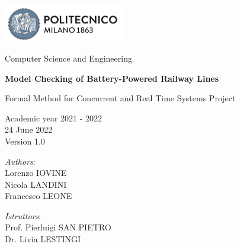 
\usepackage{listings}





{\begin{titlepage}
     \begin{center}
         \includegraphics[width=0.4\textwidth]{images/PolimiLogo.png}

         \vspace{0.2cm}

         \Large Computer Science and Engineering

         \vspace{0.9cm}

         \Huge \textbf{Model Checking of Battery-Powered Railway Lines}

         \vspace{0.7cm}
         \huge Formal Method for Concurrent and Real Time Systems Project

         \vspace{1.5cm}
         \Large Academic year 2021 - 2022\\
         \vspace{1cm}
         24 June 2022\\Version 1.0
         \vspace{3cm}

         \large
         \begin{minipage}{.1\textwidth}
             \null
         \end{minipage}%
         \begin{minipage}{.4\textwidth}
             \textit{Authors}:\\
             Lorenzo IOVINE\\
             Nicola LANDINI\\
             Francesco LEONE
         \end{minipage}%
         \begin{minipage}{.4\textwidth}
             \raggedleft
             \textit{Istruttors}:\\
             Prof. Pierluigi SAN PIETRO\\
             Dr. Livia LESTINGI\\
             \phantom{placeholder}
         \end{minipage}%
         \begin{minipage}{.1\textwidth}
             \null
         \end{minipage}


     \end{center}
\end{titlepage}}~\\

